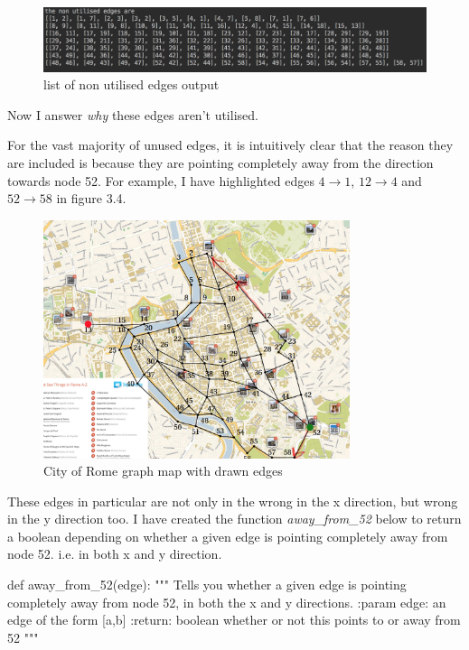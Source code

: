 \documentclass[paper=a4, fontsize=12pt]{scrartcl} %
\numberwithin{equation}{section}       %
\numberwithin{figure}{section}         %
\numberwithin{table}{section}          %
\begin{document}
\begin{enumerate}
\begin{figure}[h]
\caption{list of non utilised edges output}
\centering
\includegraphics[width=1.00\textwidth]{non_utilised_edges}
\end{figure}

Now I answer \textit{why} these edges aren't utilised. 


For the vast majority of unused edges, it is intuitively clear that the reason they are included is because they are pointing completely away from the direction towards node 52. For example, I have highlighted edges $4 \to 1$, $12 \to 4$ and $52 \to 58$ in figure 3.4.

\begin{figure}[h]
\caption{City of Rome graph map with drawn edges}
\centering
\includegraphics[width=0.8\textwidth]{drawngraph}
\end{figure}
 
These edges in particular are not only in the wrong in the x direction, but wrong in the y direction too. I have created the function \textit{away\_from\_52} below to return a boolean depending on whether a given edge is pointing completely away from node 52. i.e. in both x and y direction.

\leavevmode
\newline
\leavevmode
\newline



\begin{python}
def away_from_52(edge):
    """
    Tells you whether a given edge is pointing completely away from
    node 52, in both the x and y directions.
    :param edge: an edge of the form [a,b]
    :return: boolean whether or not this points to or away from 52
    """


\end{python}
\end{enumerate}
\end{document}
